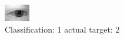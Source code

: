 \begin{figure}[h!]
\begin{center}
\includegraphics[width=0.60\columnwidth]{figures/ID359_class_1_target_2.png}
\end{center}
\caption{ Classification: 1 actual target: 2}
\label{fig:ID359_class_1_target_2}
\end{figure}
